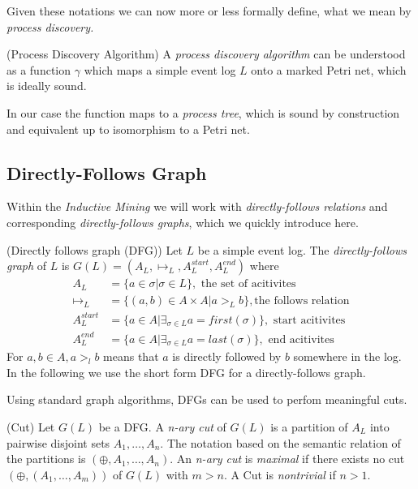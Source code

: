 \documentclass[a4paper]{IEEEtran}
\begin{document}
Given these notations we can now more or less formally define, what we mean by \textit{process discovery.}
\begin{defn} (Process Discovery Algorithm) \cite{process_mining}
A \textit{process discovery algorithm} can be understood as a function $\gamma$ which maps a simple event log $L$ onto a marked Petri net, which is ideally sound. 
\end{defn}
In our case the function maps to a \textit{process tree}, which is sound by construction and equivalent up to isomorphism to a Petri net.


\subsection{Directly-Follows Graph}
Within the \textit{Inductive Mining} we will work with \textit{directly-follows relations} and corresponding \textit{directly-follows graphs}, which we quickly introduce here. 
\begin{defn}(Directly follows graph (DFG)) \cite{process_mining} Let $L$ be a simple event log. The \textit{directly-follows graph } of $L$ is $G(L) = ( A_L, \mapsto_L, A_L^{start}, A_L^{end})$ where 
\begin{align}
    A_L &= \{ a \in \sigma | \sigma \in L\}, \text{ the set of acitivites} \\
    \mapsto_L &= \{ (a,b) \in A \times A | a >_L b \}, \text{the follows relation} \\
    A_L^{start} &= \{ a \in A | \exists_{\sigma \in L} a = first(\sigma) \}, \text{ start acitivites} \\
    A_L^{end} &= \{ a \in A | \exists_{\sigma \in L} a = last(\sigma) \}, \text{ end acitivites}
\end{align}
For $a, b \in A, a >_l b$ means that $a$ is directly followed by $b$ somewhere in the log. In the following we use the short form DFG for a directly-follows graph.
\end{defn}
Using standard graph algorithms, DFGs can be used to perfom meaningful cuts.
\begin{defn} (Cut) \cite{process_mining} Let $G(L)$ be a DFG. A \textit{n-ary cut} of $G(L)$ is a partition of $A_L$ into pairwise disjoint sets $A_1, \dots, A_n$. The notation based on the semantic relation of the partitions is $(\oplus, A_1, \dots, A_n)$. An \textit{n-ary cut} is \textit{maximal} if there exists no cut $(\oplus, (A_1, \dots, A_{m}))$ of $G(L)$ with $m > n$. A Cut is \textit{nontrivial} if $n > 1$. 
\end{defn}
\end{document}
